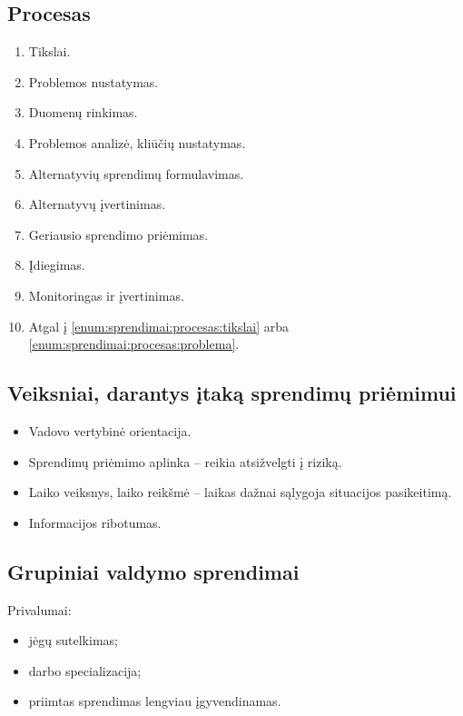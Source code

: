 \subsection{Procesas}

\begin{enumerate}
  \item \label{enum:sprendimai:procesas:tikslai} Tikslai.
  \item \label{enum:sprendimai:procesas:problema} Problemos nustatymas.
  \item Duomenų rinkimas.
  \item Problemos analizė, kliūčių nustatymas.
  \item Alternatyvių sprendimų formulavimas.
  \item Alternatyvų įvertinimas.
  \item Geriausio sprendimo priėmimas.
  \item Įdiegimas.
  \item Monitoringas ir įvertinimas.
  \item Atgal į \ref{enum:sprendimai:procesas:tikslai} arba
    \ref{enum:sprendimai:procesas:problema}.
\end{enumerate}

\subsection{Veiksniai, darantys įtaką sprendimų priėmimui}

\begin{itemize}
  \item Vadovo vertybinė orientacija.
  \item Sprendimų priėmimo aplinka – reikia atsižvelgti į riziką.
  \item Laiko veiksnys, laiko reikšmė – laikas dažnai sąlygoja situacijos
    pasikeitimą.
  \item Informacijos ribotumas.
\end{itemize}

\subsection{Grupiniai valdymo sprendimai}

Privalumai:
\begin{itemize}
  \item jėgų sutelkimas;
  \item darbo specializacija;
  \item priimtas sprendimas lengviau įgyvendinamas.
\end{itemize}

